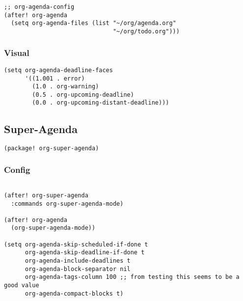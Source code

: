 \documentclass[c]{article}
\theoremstyle{plain}%
\theoremstyle{definition}
\theoremstyle{remark}
\begin{document}
\begin{verbatim}
;; org-agenda-config
(after! org-agenda
  (setq org-agenda-files (list "~/org/agenda.org"
                               "~/org/todo.org")))
\end{verbatim}
\subsubsection{Visual}
\label{sec:org98babf8}
\begin{verbatim}
(setq org-agenda-deadline-faces
      '((1.001 . error)
        (1.0 . org-warning)
        (0.5 . org-upcoming-deadline)
        (0.0 . org-upcoming-distant-deadline)))
\end{verbatim}
\subsection{Super-Agenda}
\label{sec:org36f5461}
\begin{verbatim}
(package! org-super-agenda)
\end{verbatim}
\subsubsection{Config}
\label{sec:orgca1e48e}
\begin{verbatim}

(after! org-super-agenda
  :commands org-super-agenda-mode)

(after! org-agenda
  (org-super-agenda-mode))

(setq org-agenda-skip-scheduled-if-done t
      org-agenda-skip-deadline-if-done t
      org-agenda-include-deadlines t
      org-agenda-block-separator nil
      org-agenda-tags-column 100 ;; from testing this seems to be a good value
      org-agenda-compact-blocks t)
\end{verbatim}
\end{document}
